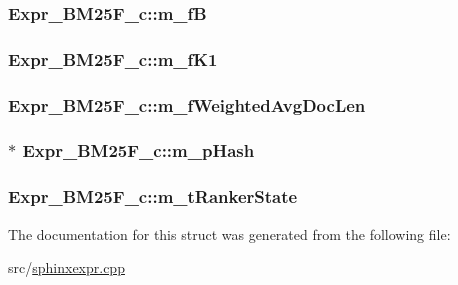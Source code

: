\hypertarget{structExpr__BM25F__c_a573e1646deee609cc9b8f239a5960e3c}{
\subsubsection[{m\-\_\-f\-B}]{ Expr\-\_\-\-B\-M25\-F\-\_\-c\-::m\-\_\-f\-B}}\label{structExpr__BM25F__c_a573e1646deee609cc9b8f239a5960e3c}
\hypertarget{structExpr__BM25F__c_aefc021dae13aaa01f05751b5e6e4ad75}{
\subsubsection[{m\-\_\-f\-K1}]{ Expr\-\_\-\-B\-M25\-F\-\_\-c\-::m\-\_\-f\-K1}}\label{structExpr__BM25F__c_aefc021dae13aaa01f05751b5e6e4ad75}
\hypertarget{structExpr__BM25F__c_a631357b2c7382a52d673d0c3851da4df}{
\subsubsection[{m\-\_\-f\-Weighted\-Avg\-Doc\-Len}]{ Expr\-\_\-\-B\-M25\-F\-\_\-c\-::m\-\_\-f\-Weighted\-Avg\-Doc\-Len}}\label{structExpr__BM25F__c_a631357b2c7382a52d673d0c3851da4df}
\hypertarget{structExpr__BM25F__c_a0694a50b644bc2ab7883fcac97598c99}{
\subsubsection[{m\-\_\-p\-Hash}]{$\ast$ Expr\-\_\-\-B\-M25\-F\-\_\-c\-::m\-\_\-p\-Hash}}\label{structExpr__BM25F__c_a0694a50b644bc2ab7883fcac97598c99}
\hypertarget{structExpr__BM25F__c_a25dfbf45de7a1245ba1a392c6d18e71b}{
\subsubsection[{m\-\_\-t\-Ranker\-State}]{ Expr\-\_\-\-B\-M25\-F\-\_\-c\-::m\-\_\-t\-Ranker\-State}}\label{structExpr__BM25F__c_a25dfbf45de7a1245ba1a392c6d18e71b}


The documentation for this struct was generated from the following file\-:\begin{DoxyCompactItemize}
\item 
src/\hyperlink{sphinxexpr_8cpp}{sphinxexpr.\-cpp}\end{DoxyCompactItemize}
